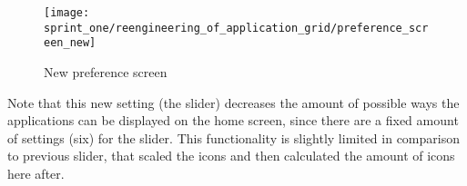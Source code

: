 \begin{figure}[!htbp]
    \centering
    \texttt{[image: sprint\_one/reengineering\_of\_application\_grid/preference\_screen\_new]}
    \caption{New preference screen}
    \label{fig:preference_screen_new}
\end{figure}

Note that this new setting (the slider) decreases the amount of possible ways the applications can be displayed on the home screen, since there are a fixed amount of settings (six) for the slider. This functionality is slightly limited in comparison to previous slider, that scaled the icons and then calculated the amount of icons here after. 